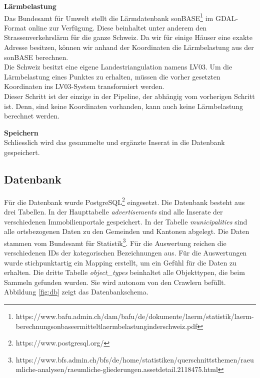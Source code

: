 %
\textbf{Lärmbelastung}\\
Das Bundesamt für Umwelt stellt die Lärmdatenbank sonBASE\footnote{https://www.bafu.admin.ch/dam/bafu/de/dokumente/laerm/statistik/laerm-berechnungsonbaseermitteltlaermbelastunginderschweiz.pdf} im GDAL-Format online zur Verfügung. Diese beinhaltet unter anderem den Strassenverkehrslärm für die ganze Schweiz. Da wir für einige Häuser eine exakte Adresse besitzen, können wir anhand der Koordinaten die Lärmbelastung aus der \mbox{sonBASE} berechnen.\\
Die Schweiz besitzt eine eigene Landestriangulation namens LV03. Um die Lärmbelastung eines Punktes zu erhalten, müssen die vorher gesetzten Koordinaten ins LV03-System transformiert werden.\\
Dieser Schritt ist der einzige in der Pipeline, der abhängig vom vorherigen Schritt ist. Denn, sind keine Koordinaten vorhanden, kann auch keine Lärmbelastung berechnet werden.

\textbf{Speichern}\\
Schliesslich wird das gesammelte und ergänzte Inserat in die Datenbank gespeichert.

\subsection{Datenbank}
Für die Datenbank wurde PostgreSQL\footnote{https://www.postgresql.org/} eingesetzt. Die Datenbank besteht aus drei Tabellen. In der Haupttabelle \textit{advertisements} sind alle Inserate der verschiedenen Immobilienportale gespeichert. In der Tabelle \textit{municipalities} sind alle ortsbezogenen Daten zu den Gemeinden und Kantonen abgelegt. Die Daten stammen vom Bundesamt für Statistik\footnote{https://www.bfs.admin.ch/bfs/de/home/statistiken/querschnittsthemen/raeumliche-analysen/raeumliche-gliederungen.assetdetail.2118475.html}. Für die Auswertung reichen die verschiedenen IDs der kategorischen Bezeichnungen aus. Für die Auswertungen wurde stichpunktartig ein Mapping erstellt, um ein Gefühl für die Daten zu erhalten.
Die dritte Tabelle \textit{object\_types} beinhaltet alle Objekttypen, die beim Sammeln gefunden wurden. Sie wird autonom von den Crawlern befüllt.\\
Abbildung \ref{fig:db} zeigt das Datenbankschema.

